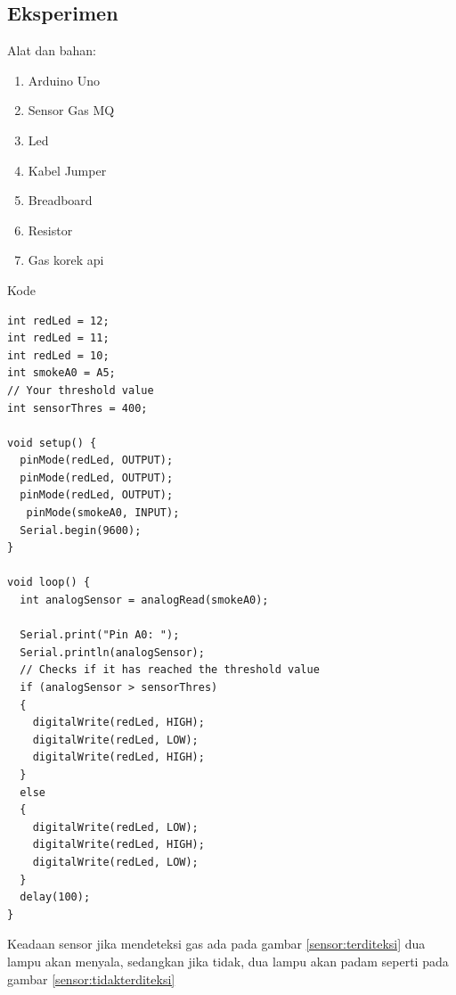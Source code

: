 \subsection{Eksperimen}
Alat dan bahan:
\begin{enumerate}
\item Arduino Uno
\item Sensor Gas MQ
\item Led
\item Kabel Jumper
\item Breadboard
\item Resistor
\item Gas korek api
\end{enumerate}
Kode
\begin{verbatim}
int redLed = 12;
int redLed = 11;
int redLed = 10;
int smokeA0 = A5;
// Your threshold value
int sensorThres = 400;

void setup() {
  pinMode(redLed, OUTPUT);
  pinMode(redLed, OUTPUT);
  pinMode(redLed, OUTPUT);
   pinMode(smokeA0, INPUT);
  Serial.begin(9600);
}

void loop() {
  int analogSensor = analogRead(smokeA0);

  Serial.print("Pin A0: ");
  Serial.println(analogSensor);
  // Checks if it has reached the threshold value
  if (analogSensor > sensorThres)
  {
    digitalWrite(redLed, HIGH);
    digitalWrite(redLed, LOW);
    digitalWrite(redLed, HIGH);
  }
  else
  {
    digitalWrite(redLed, LOW);
    digitalWrite(redLed, HIGH);
    digitalWrite(redLed, LOW);
  }
  delay(100);
}
\end{verbatim}

Keadaan sensor jika mendeteksi gas ada pada gambar \ref{sensor:terditeksi} dua lampu akan menyala, sedangkan jika tidak, dua lampu akan padam seperti pada gambar \ref{sensor:tidakterditeksi}

